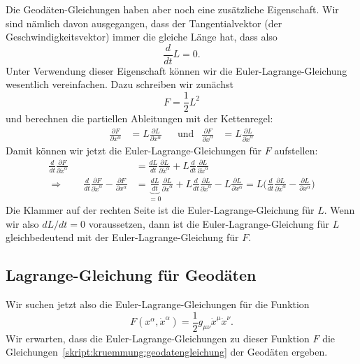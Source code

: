 Die Geodäten-Gleichungen haben aber noch eine zusätzliche Eigenschaft.
Wir sind nämlich davon ausgegangen, dass der Tangentialvektor (der
Geschwindigkeitsvektor) immer die gleiche Länge hat, dass also
\[
\frac{d}{dt}L=0.
\]
Unter Verwendung dieser Eigenschaft können wir die Euler-Lagrange-Gleichung
wesentlich vereinfachen.
Dazu schreiben wir zunächst
\[
F=\frac12 L^2
\]
und berechnen die partiellen Ableitungen mit der Kettenregel:
\[
\begin{aligned}
\frac{\partial F}{\partial x^\alpha}
&=
L
\frac{\partial L}{\partial x^\alpha}
&&\text{und}
&
\frac{\partial F}{\partial \dot x^\alpha}
&=
L\frac{\partial L}{\partial\dot x^\alpha}
\end{aligned}
\]
Damit können wir jetzt die Euler-Lagrange-Gleichungen für $F$ aufstellen:
\begin{align*}
\frac{d}{dt}
\frac{\partial F}{\partial \dot x^\alpha}
&=
\frac{dL}{dt} \frac{\partial L}{\partial\dot x^\alpha}
+
L\frac{d}{dt}\frac{\partial L}{\partial\dot x^\alpha}
\\
\Rightarrow\qquad
\frac{d}{dt}
\frac{\partial F}{\partial \dot x^\alpha}
-
\frac{\partial F}{\partial x^\alpha}
&=
\underbrace{\frac{dL}{dt}}_{\displaystyle =0}
\frac{\partial L}{\partial\dot x^\alpha}
+
L\frac{d}{dt}\frac{\partial L}{\partial\dot x^\alpha}
-
L
\frac{\partial L}{\partial x^\alpha}
=
L\biggl(
\frac{d}{dt}\frac{\partial L}{\partial\dot x^\alpha}
-
\frac{\partial L}{\partial x^\alpha}
\biggr)
\end{align*}
Die Klammer auf der rechten Seite ist die Euler-Lagrange-Gleichung für
$L$.
Wenn wir also $dL/dt=0$ voraussetzen, dann ist die Euler-Lagrange-Gleichung
für $L$ gleichbedeutend mit der Euler-Lagrange-Gleichung für $F$.

\subsection{Lagrange-Gleichung für Geodäten}
Wir suchen jetzt also die Euler-Lagrange-Gleichungen für die Funktion
\[
F(x^\alpha, \dot x^\alpha) = \frac12 g_{\mu\nu} \dot x^\mu \dot x^\nu.
\]
Wir erwarten, dass die Euler-Lagrange-Gleichungen zu dieser Funktion $F$
die Gleichungen~\eqref{skript:kruemmung:geodatengleichung}
der Geodäten ergeben.

